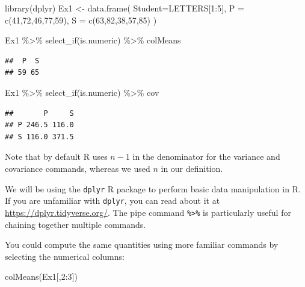 \documentclass[
]{book}
\newenvironment{Shaded}{\begin{snugshade}}{\end{snugshade}}
\newcommand{\AttributeTok}[1]{\textcolor[rgb]{0.77,0.63,0.00}{#1}}
\newcommand{\DecValTok}[1]{\textcolor[rgb]{0.00,0.00,0.81}{#1}}
\newcommand{\FunctionTok}[1]{\textcolor[rgb]{0.00,0.00,0.00}{#1}}
\newcommand{\NormalTok}[1]{#1}
\newcommand{\OtherTok}[1]{\textcolor[rgb]{0.56,0.35,0.01}{#1}}
\newcommand{\SpecialCharTok}[1]{\textcolor[rgb]{0.00,0.00,0.00}{#1}}
\theoremstyle{definition}
\theoremstyle{definition}
\theoremstyle{definition}
\theoremstyle{definition}
\theoremstyle{remark}
\begin{document}
\begin{Shaded}
\begin{Highlighting}[]
\FunctionTok{library}\NormalTok{(dplyr)}
\NormalTok{Ex1 }\OtherTok{\textless{}{-}} \FunctionTok{data.frame}\NormalTok{(}
  \AttributeTok{Student=}\NormalTok{LETTERS[}\DecValTok{1}\SpecialCharTok{:}\DecValTok{5}\NormalTok{],}
  \AttributeTok{P =} \FunctionTok{c}\NormalTok{(}\DecValTok{41}\NormalTok{,}\DecValTok{72}\NormalTok{,}\DecValTok{46}\NormalTok{,}\DecValTok{77}\NormalTok{,}\DecValTok{59}\NormalTok{),}
  \AttributeTok{S =} \FunctionTok{c}\NormalTok{(}\DecValTok{63}\NormalTok{,}\DecValTok{82}\NormalTok{,}\DecValTok{38}\NormalTok{,}\DecValTok{57}\NormalTok{,}\DecValTok{85}\NormalTok{)}
\NormalTok{  )}

\NormalTok{Ex1 }\SpecialCharTok{\%\textgreater{}\%} \FunctionTok{select\_if}\NormalTok{(is.numeric) }\SpecialCharTok{\%\textgreater{}\%}\NormalTok{ colMeans}
\end{Highlighting}
\end{Shaded}

\begin{verbatim}
##  P  S 
## 59 65
\end{verbatim}

\begin{Shaded}
\begin{Highlighting}[]
\NormalTok{Ex1 }\SpecialCharTok{\%\textgreater{}\%} \FunctionTok{select\_if}\NormalTok{(is.numeric) }\SpecialCharTok{\%\textgreater{}\%}\NormalTok{ cov}
\end{Highlighting}
\end{Shaded}

\begin{verbatim}
##       P     S
## P 246.5 116.0
## S 116.0 371.5
\end{verbatim}

Note that by default R uses \(n-1\) in the denominator for the variance and covariance commands, whereas we used \(n\) in our definition.

We will be using the \texttt{dplyr} R package to perform basic data manipulation in R. If you are unfamiliar with \texttt{dplyr}, you can read about it at \url{https://dplyr.tidyverse.org/}. The pipe command \texttt{\%\textgreater{}\%} is particularly useful for chaining together multiple commands.

You could compute the same quantities using more familiar commands by selecting the numerical columns:

\begin{Shaded}
\begin{Highlighting}[]
\FunctionTok{colMeans}\NormalTok{(Ex1[,}\DecValTok{2}\SpecialCharTok{:}\DecValTok{3}\NormalTok{])}
\end{Highlighting}
\end{Shaded}
\end{document}
